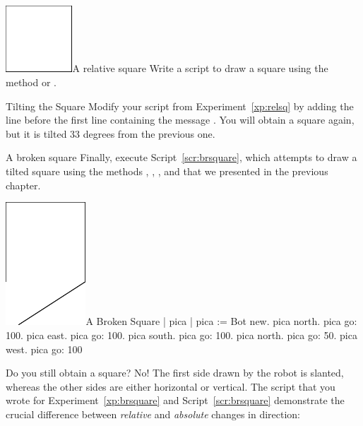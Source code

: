 \documentclass[a4paper,10pt,twoside]{book}
\begin{document}
\begin{exofigwithsize}[0.7]{\includegraphics[width=2.5cm]{ChTurnfirstSquare}}{A relative square}\label{xp:relsq}
Write a script to draw a square using the method  or . 
\end{exofigwithsize}


\begin{exonofigtitle}{Tilting the Square}\label{xp:titledsquare}
Modify your script from Experiment~\ref{xp:relsq} by adding the line  before the first line containing the message . You will obtain a square again, but it is tilted 33 degrees from the previous one. 
\end{exonofigtitle}




\begin{exonofigtitle}{A broken square}\label{xp:brsquare}
Finally, execute Script~\ref{scr:brsquare}, which attempts to draw a tilted square using the methods , , , and  that we presented in the previous chapter. 
\end{exonofigtitle}


\begin{scriptfigwithsize}[0.4]{\includegraphics[width=3cm]{ChTurnbadSquare}}{A Broken Square}\label{scr:brsquare}
	| pica | 
	pica := Bot new. 
	pica north. 
	pica go: 100. 
	pica east. 
	pica go: 100. 
	pica south. 
	pica go: 100. 
	pica north. 
	pica go: 50. 
	pica west. 
	pica go: 100
\end{scriptfigwithsize}

Do you still obtain a square? No! The first side drawn by the robot is slanted, whereas the 
other sides are either horizontal or vertical. The script that you wrote for Experiment~\ref{xp:brsquare} and 
Script~\ref{scr:brsquare} demonstrate the crucial difference between \emph{relative} and \emph{absolute}
 changes in direction: 
\end{document}
